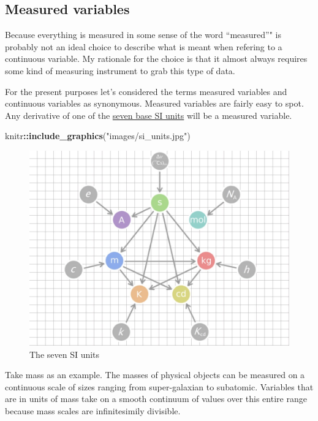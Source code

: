 \documentclass[]{book}
\newenvironment{Shaded}{\begin{snugshade}}{\end{snugshade}}
\newcommand{\KeywordTok}[1]{\textcolor[rgb]{0.13,0.29,0.53}{\textbf{#1}}}
\newcommand{\NormalTok}[1]{#1}
\newcommand{\OperatorTok}[1]{\textcolor[rgb]{0.81,0.36,0.00}{\textbf{#1}}}
\newcommand{\StringTok}[1]{\textcolor[rgb]{0.31,0.60,0.02}{#1}}
\begin{document}
\hypertarget{measured-variables}{%
\subsection{Measured variables}\label{measured-variables}}

Because everything is measured in some sense of the word ``measured''" is probably not an ideal choice to describe what is meant when refering to a continuous variable. My rationale for the choice is that it almost always requires some kind of measuring instrument to grab this type of data.

For the present purposes let's considered the terms measured variables and continuous variables as synonymous. Measured variables are fairly easy to spot. Any derivative of one of the \href{https://www.nist.gov/pml/weights-and-measures/metric-si/si-units}{seven base SI units} will be a measured variable.

\begin{Shaded}
\begin{Highlighting}[]
\NormalTok{knitr}\OperatorTok{::}\KeywordTok{include_graphics}\NormalTok{(}\StringTok{"images/si_units.jpg"}\NormalTok{)}
\end{Highlighting}
\end{Shaded}

\begin{figure}
\includegraphics[width=13.33in]{images/si_units} \caption{The seven SI units}\label{fig:unnamed-chunk-26}
\end{figure}

Take mass as an example. The masses of physical objects can be measured on a continuous scale of sizes ranging from super-galaxian to subatomic. Variables that are in units of mass take on a smooth continuum of values over this entire range because mass scales are infinitesimily divisible.
\end{document}
